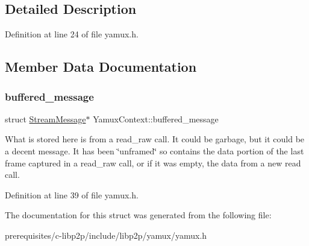 \subsection{Detailed Description}


Definition at line 24 of file yamux.\+h.



\subsection{Member Data Documentation}
\mbox{\label{struct_yamux_context_aead2ca72642a6109167f0fe86cf6f728}} 
\subsubsection{\texorpdfstring{buffered\+\_\+message}{buffered\_message}}
{\footnotesize\ttfamily struct \mbox{\hyperlink{struct_stream_message}{Stream\+Message}}$\ast$ Yamux\+Context\+::buffered\+\_\+message}

What is stored here is from a read\+\_\+raw call. It could be garbage, but it could be a decent message. It has been \char`\"{}unframed\char`\"{} so contains the data portion of the last frame captured in a read\+\_\+raw call, or if it was empty, the data from a new read call. 

Definition at line 39 of file yamux.\+h.



The documentation for this struct was generated from the following file\+:\begin{DoxyCompactItemize}
\item 
prerequisites/c-\/libp2p/include/libp2p/yamux/yamux.\+h\end{DoxyCompactItemize}
